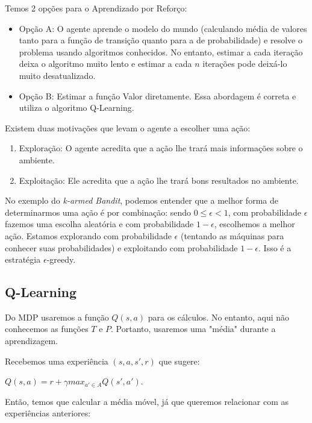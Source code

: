 \documentclass[12pt,letterpaper]{article}
\begin{document}
	Temos 2 opções para o Aprendizado por Reforço:
	
	\begin{itemize}
		\item Opção A: O agente aprende o modelo do mundo (calculando média de valores tanto para a função de transição quanto para a de probabilidade) e resolve o problema usando algoritmos conhecidos. No entanto, estimar a cada iteração deixa o algoritmo muito lento e estimar a cada $n$ iterações pode deixá-lo muito desatualizado.
		\item Opção B: Estimar a função Valor diretamente. Essa abordagem é correta e utiliza o algoritmo Q-Learning.
	\end{itemize}
	
	Existem duas motivações que levam o agente a escolher uma ação:
	
	\begin{enumerate}
		\item Exploração: O agente acredita que a ação lhe trará mais informações sobre o ambiente.
		\item Exploitação: Ele acredita que a ação lhe trará bons resultados no ambiente. 
	\end{enumerate}
	
	No exemplo do \textit{k-armed Bandit}, podemos entender que a melhor forma de determinarmos uma ação é por combinação: sendo $0 \leq \epsilon < 1$, com probabilidade $\epsilon$ fazemos uma escolha aleatória e com probabilidade $1-\epsilon$, escolhemos a melhor ação. Estamos explorando com probabilidade $\epsilon$ (tentando as máquinas para conhecer suas probabilidades) e exploitando com probabilidade $1-\epsilon$. Isso é a estratégia $\epsilon$-greedy.
	
	\subsection*{Q-Learning}
	
	Do MDP usaremos a função $Q(s,a)$ para os cálculos. No entanto, aqui não conhecemos as funções $T$ e $P$. Portanto, usaremos uma "média" durante a aprendizagem.
	
	Recebemos uma experiência $(s, a, s', r)$ que sugere: 
	
	\begin{center}
		$Q(s,a) = r + \gamma max_{a' \in A} Q(s', a')$.
	\end{center}
	
	Então, temos que calcular a média móvel, já que queremos relacionar com as experiências anteriores:
	
\end{document}
